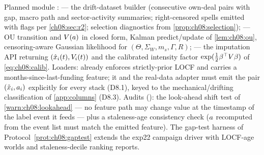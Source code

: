 \begin{codehooks}
Planned module :  --- the drift-dataset
builder (consecutive own-deal pairs with gap, macro path and
sector-activity summaries; right-censored spells emitted with flags per
\cref{ch08:sec:r2}; selection diagnostics from
\cref{prop:ch08:selection});  --- OU transition and
$V(a)$ in closed form, Kalman predict/update of
\cref{lem:ch08:ou}, censoring-aware Gaussian likelihood for $(\Theta,
\Sigma_W, m_s, \Gamma, R)$;  --- the imputation API
returning $(\hat{x}_i(t), V_i(t))$ and the calibrated intensity factor
$\exp(\tfrac12\beta^{\top} V\beta)$ of \cref{eq:ch08:calib}. Loaders:
 already enforces strictly-prior LOCF and
carries a months-since-last-funding feature; it and the real-data
adapter  must emit the pair $(\tilde{x}_i,
a_i)$ explicitly for every stack (D8.1), keyed to the
mechanical/drifting classification of \cref{app:columns} (D8.3).
Audits (): the look-ahead shift test of
\cref{warn:ch08:lookahead} --- no feature path may change value at the
timestamp of the label event it feeds --- plus a staleness-age
consistency check ($a$ recomputed from the event list must match
the emitted feature). The gap-test harness of Protocol~\ref{prot:ch08:gaptest}
extends the exp22 campaign driver with LOCF-age worlds and
staleness-decile ranking reports.
\end{codehooks}
